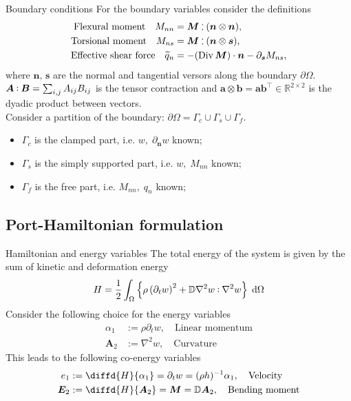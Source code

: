 \documentclass[aspectratio=169]{ISAE-Beamer}
\DeclareMathOperator*{\Div}{Div}
\def\onedot{$\mathsurround0pt\ldotp$}
\def\cddot{%
	\mathbin{\vcenter{\baselineskip.67ex
			\hbox{\onedot}\hbox{\onedot}}%
}}
\begin{document}
\begin{frame}{Boundary conditions}
For the boundary variables consider the definitions
\begin{align*}
\text{Flexural moment} \quad M_{nn} &= \bm{M} \cddot (\bm{n}\otimes\bm{n}), \\
\text{Torsional moment} \quad M_{ns} &= \bm{M} \cddot (\bm{n}\otimes\bm{s}), \\
\text{Effective shear force} \quad \widetilde{q}_n &= -(\Div \bm{M}) \cdot \bm{n} - \partial_{\bm{s}} M_{ns}, 
\end{align*}
where $\bm{n}, \, \bm{s}$ are the normal and tangential versors along the boundary $\partial \Omega$. \\
$\bm{A} \cddot \bm{B} = \sum_{i, j} A_{ij} B_{ij}$ is the tensor contraction and $\bm{a} \otimes \bm{b} = \bm{a} \bm{b}^\top \in \mathbb{R}^{2\times 2}$ is the dyadic product between vectors. \\
Consider a partition of the boundary: $\partial \Omega = \Gamma_c \cup \Gamma_s \cup \Gamma_f$.
\begin{itemize}
	\item $\Gamma_c$ is the clamped part, i.e. $w, \; \partial_{\bm{n}}w$ known;
	\item $\Gamma_s$ is the simply supported part, i.e. $w, \; M_{nn}$ known;
	\item $\Gamma_f$ is the free part, i.e. $M_{nn}, \; q_n$ known;
\end{itemize}
\end{frame}

\subsection{Port-Hamiltonian formulation}

\begin{frame}{Hamiltonian and energy variables}
The total energy of the system is given by the sum of kinetic and deformation energy
\[
H = \frac{1}{2} \int_{\Omega} \left\{\rho \left(\partial_t w\right)^2 + \mathbb{D} \nabla^2 w \cddot \nabla^2 w \right\} \d{\Omega}
\] 
Consider the following choice for the energy variables
\begin{align*}
	\alpha_1 &:= \rho \partial_t w, \quad \text{Linear momentum} \\
	\bm{A}_2 &:=  \nabla^2 w, \quad \text{Curvature}
\end{align*}
This leads to the following co-energy variables
\begin{align*}
e_1 &:= \diffd{H}{\alpha_1} =  \partial_t w = (\rho h)^{-1} \alpha_1, \quad \text{Velocity} \\
\bm{E}_2 &:= \diffd{H}{\bm{A}_2} = \bm{M} = \mathbb{D} \bm{A}_2, \quad \text{Bending moment}
\end{align*}
\end{frame}
\end{document}
